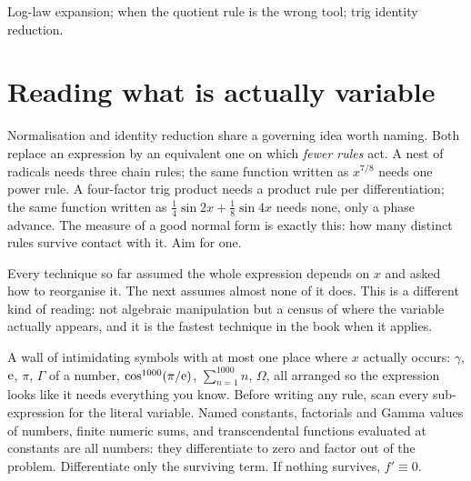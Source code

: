 \begin{seealsob}Log-law expansion; when the quotient rule is the wrong tool; trig identity reduction.\end{seealsob}

\section{Reading what is actually variable}

Normalisation and identity reduction share a governing idea worth naming. Both replace an expression by an equivalent one on which \emph{fewer rules} act. A nest of radicals needs three chain rules; the same function written as $x^{7/8}$ needs one power rule. A four-factor trig product needs a product rule per differentiation; the same function written as $\tfrac14\sin2x+\tfrac18\sin4x$ needs none, only a phase advance. The measure of a good normal form is exactly this: how many distinct rules survive contact with it. Aim for one.

Every technique so far assumed the whole expression depends on $x$ and asked how to reorganise it. The next assumes almost none of it does. This is a different kind of reading: not algebraic manipulation but a census of where the variable actually appears, and it is the fastest technique in the book when it applies.

\cue A wall of intimidating symbols with at most one place where $x$ actually occurs: $\gamma$, $\mathrm{e}$, $\pi$, $\Gamma$ of a number, $\cos^{1000}(\pi/\mathrm{e})$, $\sum_{n=1}^{1000}n$, $\Omega$, all arranged so the expression looks like it needs everything you know.
\method Before writing any rule, scan every sub-expression for the literal variable. Named constants, factorials and Gamma values of numbers, finite numeric sums, and transcendental functions evaluated at constants are all numbers: they differentiate to zero and factor out of the problem. Differentiate only the surviving term. If nothing survives, $f'\equiv0$.

